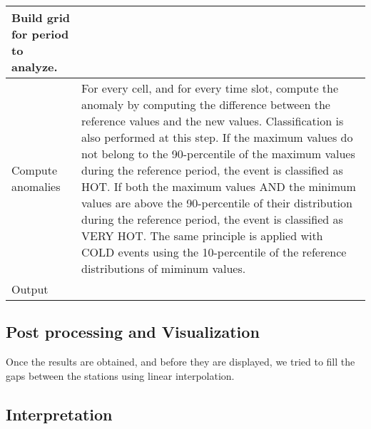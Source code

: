 \documentclass[12pt]{article}
\begin{document}
\begin{table}[h]
\begin{tabular}{|l|l|}
Build grid for period to analyze. &                                                                                                                                                                                                                                                                                                                                                                                                                                                                                                                                                                                                                                                                          \\ \hline
Compute anomalies                 & For every cell, and for every time slot, compute the anomaly by computing the difference between the reference values and the new values. Classification is also performed at this step. If the maximum values do not belong to the 90-percentile of the maximum values during the reference period, the event is classified as HOT. If both the maximum values AND the minimum values are above the 90-percentile of their distribution during the reference period, the event is classified as VERY HOT. The same principle is applied with COLD events using the 10-percentile of the reference distributions of miminum values.                                      \\ \hline
Output                            &                                                                                                                                                                                                                                                                                                                                                                                                                                                                                                                                                                                                                                                                          \\ \hline
\end{tabular}
\end{table}

\subsection{Post processing and Visualization}

Once the results are obtained, and before they are displayed, we tried to fill the gaps between the stations using linear interpolation.

\subsection{Interpretation}
\end{document}
